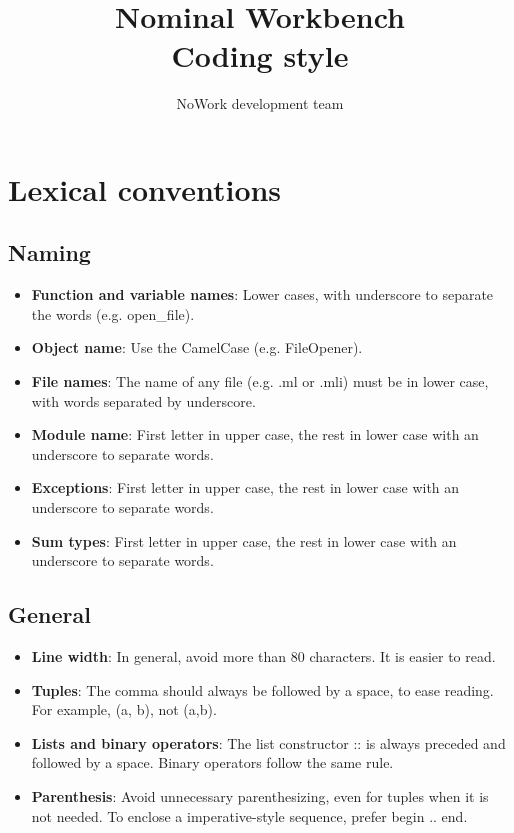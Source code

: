 \documentclass[12pt,a4paper]{article}
\title{Nominal Workbench \\
  Coding style}
\author{NoWork development team\\[2em]}
\begin{document}
\maketitle

\section{Lexical conventions}

\subsection{Naming}

\medskip

\begin{itemize}
\item \textbf{Function and variable names}: Lower cases, with underscore to 
  separate the words (e.g. open\_file).
\item \textbf{Object name}: Use the CamelCase (e.g. FileOpener).
\item \textbf{File names}: The name of any file (e.g. .ml or .mli) must be in
  lower case, with words separated by underscore.
\item \textbf{Module name}: First letter in upper case, the rest in lower case
  with an underscore to separate words.
\item \textbf{Exceptions}: First letter in upper case, the rest in
  lower case with an underscore to separate words.
\item \textbf{Sum types}: First letter in upper case, the rest in lower case
  with an underscore to separate words.
\end{itemize}

\subsection{General}

\medskip 

\begin{itemize}
\item \textbf{Line width}: In general, avoid more than 80 characters. It is
  easier to read.
\item \textbf{Tuples}: The comma should always be followed by a space, to ease
  reading. For example, \textsf{(a, b)}, not \textsf{(a,b)}.
\item \textbf{Lists and binary operators}: The list constructor \textsf{::} is
  always preceded and followed by a space. Binary operators follow the same
  rule.
\item \textbf{Parenthesis}: Avoid unnecessary parenthesizing, even for tuples when
  it is not needed. To enclose a imperative-style sequence, prefer \textsf{begin
    .. end}.
\end{itemize}
\end{document}
